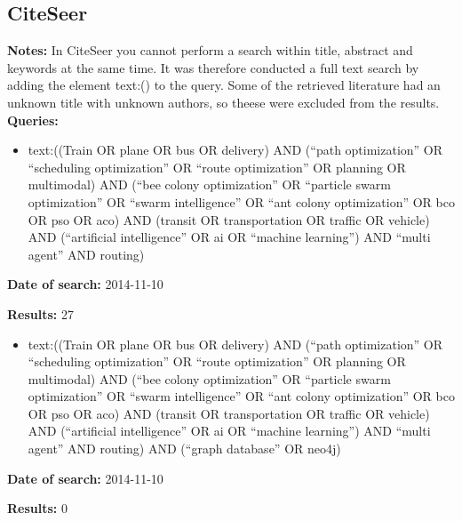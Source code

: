 \subsection{CiteSeer}
\textbf{Notes:} In CiteSeer you cannot perform a search within title, abstract and keywords at the same time. It was therefore conducted a full text search by adding the element text:() to the query.  Some of the retrieved literature had an unknown title with unknown authors, so theese were excluded from the results. 
\newline
\newline
\textbf{Queries:}
\begin{itemize}
\item text:((Train OR plane OR bus OR delivery) AND (``path optimization'' OR ``scheduling optimization'' OR ``route optimization'' OR planning OR multimodal) AND (``bee colony optimization'' OR ``particle swarm optimization'' OR ``swarm intelligence'' OR ``ant colony optimization'' OR bco OR pso OR aco) AND (transit OR transportation OR traffic OR vehicle) AND (``artificial intelligence'' OR ai OR ``machine learning'') AND ``multi agent'' AND routing)
\end{itemize}
\par \textbf{Date of search:} 2014-11-10 
\par \textbf{Results:} 27
\begin{itemize}
\item text:((Train OR plane OR bus OR delivery) AND (``path optimization'' OR ``scheduling optimization'' OR ``route optimization'' OR planning OR multimodal) AND (``bee colony optimization'' OR ``particle swarm optimization'' OR ``swarm intelligence'' OR ``ant colony optimization'' OR bco OR pso OR aco) AND (transit OR transportation OR traffic OR vehicle) AND (``artificial intelligence'' OR ai OR ``machine learning'') AND ``multi agent'' AND routing) AND (``graph database'' OR neo4j)
\end{itemize}
\par \textbf{Date of search:} 2014-11-10 
\par \textbf{Results:} 0
 

